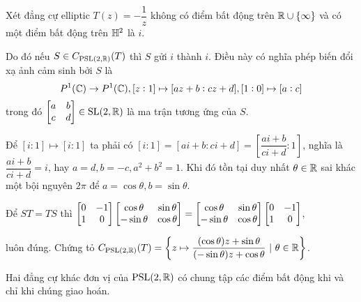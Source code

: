 \begin{exam*}
    Xét đẳng cự elliptic $T(z) = -\dfrac{1}{z}$ không có điểm bất động trên $\mathbb{R} \cup \{\infty\}$ và có một điểm bất động trên $\mathbb{H}^2$ là $i$.
    
	Do đó nếu $S \in C_{\operatorname{PSL}(2,\mathbb{R})}(T)$ thì $S$ gửi $i$ thành $i$. Điều này có nghĩa phép biến đổi xạ ảnh cảm sinh bởi $S$ là \[P^1(\mathbb{C}) \to P^1(\mathbb{C}), [z:1]\mapsto [az+b:cz+d], [1:0]\mapsto [a:c]\] trong đó $\begin{bmatrix} a & b \\ c & d \\ \end{bmatrix} \in \operatorname{SL}(2,\mathbb{R})$ là ma trận tương ứng của $S$.

    Để $[i:1] \mapsto [i:1]$ ta phải có $[i:1] = [ai+b:ci+d] = \left[\dfrac{ai+b}{ci+d}:1\right]$, nghĩa là $\dfrac{ai+b}{ci+d} = i$, hay $a= d, b = -c, a^2 + b^2 = 1$. Khi đó tồn tại duy nhất $\theta \in \mathbb{R}$ sai khác một bội nguyên $2\pi$ để $a = \cos{\theta}, b = \sin{\theta}$.
    
        Để $ST = TS$ thì 
    $\begin{bmatrix}
        0 & -1\\
        1 & 0
    \end{bmatrix}
    \begin{bmatrix} \cos{\theta} & \sin{\theta}\\ -\sin{\theta} & \cos{\theta} \end{bmatrix} =
    \begin{bmatrix} \cos{\theta} & \sin{\theta}\\ -\sin{\theta} & \cos{\theta} \end{bmatrix}
    \begin{bmatrix}
        0 & -1\\
        1 & 0
        \end{bmatrix}$,

        luôn đúng. Chứng tỏ $C_{\operatorname{PSL}(2,\mathbb{R})}(T) = \left\{z\mapsto \dfrac{(\cos{\theta})z + \sin{\theta}}{(-\sin{\theta})z+\cos{\theta}}~|~\theta \in \mathbb{R} \right\}$. 
\end{exam*}
\begin{thm}\label{thm 3.3.6}
    Hai đẳng cự khác đơn vị của $\operatorname{PSL}(2,\mathbb{R})$ có chung tập các điểm bất động khi và chỉ khi chúng giao hoán.
\end{thm}
